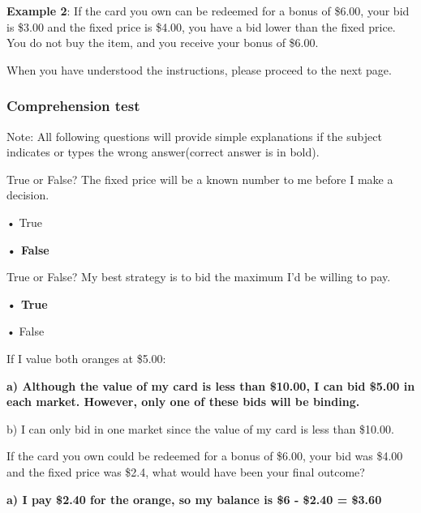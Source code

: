 \documentclass[12pt]{article}
\begin{document}
{\textbf{Example 2}: If the card you own can be redeemed for a bonus of \$6.00, your bid is \$3.00 and the fixed price is \$4.00, you have a bid lower than the fixed price. You do not buy the item, and you receive your bonus of \$6.00.

\vspace{0.5cm}

When you have understood the instructions, please proceed to the next page.
\clearpage


\subsubsection*{Comprehension test}
Note: All following questions will provide simple explanations if the subject indicates or types the wrong answer(correct answer is in bold).

\vspace{0.5cm}

True or False? The fixed price will be a known number to me before I make a decision.  

• True  \par
\textbf{• False}\par  

\vspace{0.5cm}


\vspace{0.5cm}



True or False? My best strategy is to bid the maximum I'd be willing to pay.  

\textbf{• True}  \par
• False 

\vspace{0.5cm}

If I value both oranges at \$5.00:

\textbf{a) Although the value of my card is less than \$10.00, I can bid \$5.00 in each market. However, only one of these bids will be binding.}  

b) I can only bid in one market since the value of my card is less than \$10.00.  

\vspace{0.5cm}

If the card you own could be redeemed for a bonus of \$6.00, your bid was \$4.00 and the fixed price was \$2.4, what would have been your final outcome?  

\textbf{a) I pay \$2.40 for the orange, so my balance is \$6 - \$2.40 = \$3.60 } 

}
\end{document}
